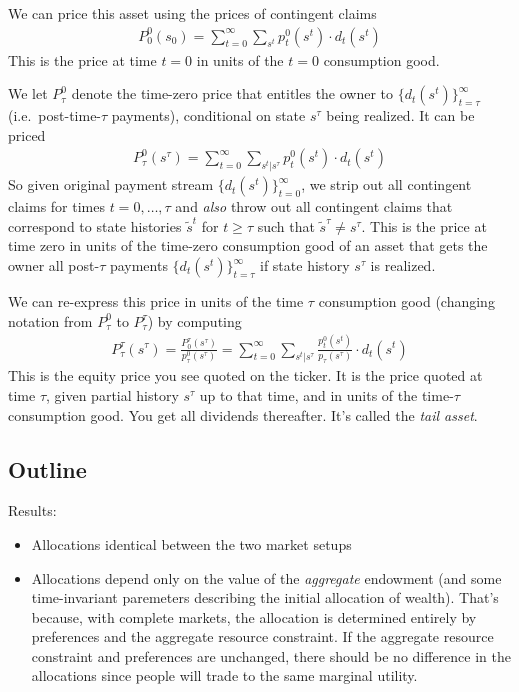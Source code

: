 \documentclass[12pt]{article}
\theoremstyle{plain}
\theoremstyle{definition}
\theoremstyle{remark}
\newcommand{\sumtinfz}{\sum^\infty_{t=0}}
\newcommand{\tinfz}{^\infty_{t=0}}
\begin{document}
We can price this asset using the prices of contingent claims
\begin{align*}
  P_0^0(s_0)
  =
  \sumtinfz \sum_{s^t} p_t^0(s^t) \cdot d_t(s^t)
\end{align*}
This is the price at time $t=0$ in units of the $t=0$ consumption good.

We let $P^0_\tau$ denote the time-zero price that entitles the owner to
$\{d_t(s^t)\}_{t=\tau}^\infty$ (i.e.\ post-time-$\tau$ payments),
conditional on state $s^\tau$ being realized. It can be priced
\begin{align*}
  P_\tau^0(s^\tau)
  =
  \sumtinfz \sum_{s^t|s^\tau} p_t^0(s^t) \cdot d_t(s^t)
\end{align*}
So given original payment stream $\{d_t(s^t)\}\tinfz$, we strip out all
contingent claims for times $t=0,\ldots,\tau$ and \emph{also}
throw out all contingent claims that correspond to state histories
$\tilde{s}^t$ for $t\geq \tau$ such that $\tilde{s}^\tau \neq s^\tau$.
This is the price at time zero in units of the time-zero consumption
good of an asset that gets the owner all post-$\tau$ payments
$\{d_t(s^t)\}^\infty_{t=\tau}$ if state history $s^\tau$ is realized.

We can re-express this price in units of the time $\tau$ consumption
good (changing notation from $P^0_\tau$ to $P^\tau_\tau$) by computing
\begin{align*}
  P_\tau^\tau(s^\tau)
  =
  \frac{P_0^\tau(s^\tau)}{p_\tau^0(s^\tau)}
  =
  \sumtinfz \sum_{s^t|s^\tau} \frac{p_t^0(s^t)}{p_\tau(s^\tau)} \cdot d_t(s^t)
\end{align*}
This is the equity price you see quoted on the ticker. It is the price
quoted at time $\tau$, given partial history $s^\tau$ up to that time, and in
units of the time-$\tau$ consumption good. You get all dividends
thereafter. It's called the \emph{tail asset}.

\clearpage
\subsection{Outline}

Results:
\begin{itemize}
  \item Allocations identical between the two market setups
  \item Allocations depend only on the value of the \emph{aggregate}
    endowment (and some time-invariant paremeters describing the initial
    allocation of wealth).
    That's because, with complete markets, the allocation is determined
    entirely by preferences and the aggregate resource constraint.
    If the aggregate resource constraint and preferences are unchanged,
    there should be no difference in the allocations since people will
    trade to the same marginal utility.
\end{itemize}
\end{document}
